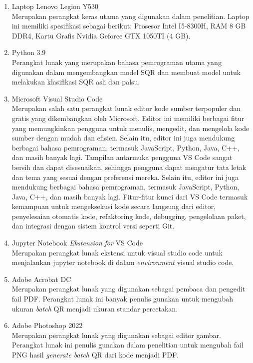 \begin{enumerate}
	\item Laptop Lenovo Legion Y530\\Merupakan perangkat keras utama yang digunakan dalam penelitian. Laptop ini memiliki spesifikasi sebagai berikut: Prosesor Intel
	      I5-8300H, RAM 8 GB DDR4, Kartu Grafis Nvidia Geforce GTX 1050TI (4 GB).
	\item Python 3.9\\Perangkat lunak yang merupakan bahasa pemrograman utama yang digunakan dalam mengembangkan model SQR dan membuat model untuk melakukan klasifikasi
	      SQR asli dan palsu.
	\item Microsoft Visual Studio Code\\Merupakan salah satu perangkat lunak editor kode sumber terpopuler dan gratis yang dikembangkan oleh Microsoft. Editor ini
	      memiliki berbagai fitur yang memungkinkan pengguna untuk menulis, mengedit, dan mengelola kode sumber dengan mudah dan efisien. Selain itu, editor ini juga
	      mendukung berbagai bahasa pemrograman, termasuk JavaScript, Python, Java, C++, dan masih banyak lagi. Tampilan antarmuka pengguna VS Code sangat bersih dan
	      dapat disesuaikan, sehingga pengguna dapat mengatur tata letak dan tema yang sesuai dengan preferensi mereka. Selain itu, editor ini juga mendukung berbagai
	      bahasa pemrograman, termasuk JavaScript, Python, Java, C++, dan masih banyak lagi. Fitur-fitur kunci dari VS Code termasuk kemampuan untuk mengeksekusi kode
	      secara langsung dari editor, penyelesaian otomatis kode, refaktoring kode, debugging, pengelolaan paket, dan integrasi dengan sistem kontrol versi seperti Git.
	\item Jupyter Notebook \emph{Ekstension} \emph{for} VS Code\\Merupakan perangkat lunak ekstensi untuk visual studio code untuk menjalankan jupyter notebook di dalam
	      \emph{environment} visual studio code.
	\item Adobe Acrobat DC\\Merupakan perangkat lunak yang digunakan sebagai pembaca dan pengedit fail PDF. Perangkat lunak ini banyak penulis gunakan untuk mengubah
	      ukuran \emph{batch} QR menjadi ukuran standar percetakan.
	\item Adobe Photoshop 2022\\Merupakan perangkat lunak yang digunakan sebagai editor gambar. Perangkat lunak ini penulis gunakan dalam penelitian untuk mengubah fail
	      PNG hasil \emph{generate batch} QR dari kode menjadi PDF.

\end{enumerate}
